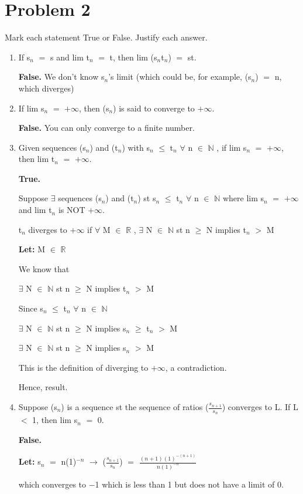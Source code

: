 \documentclass{article}
\newcommand{\mt}[1]{\ensuremath{#1}}
\newcommand\bsc[2][\DefaultOpt]{%
  \def\DefaultOpt{#2}%
  \section[#1]{#2}%
}
\newcommand{\balist}{\begin{enumerate}[label=\alph*.]}
\newcommand{\elist}{\end{enumerate}}
\newcommand{\lt}[1]{\textbf{Let: } #1}
\newcommand{\br}{\mt{\mathbb{R}} }       %
\newcommand{\bn}{\mt{\mathbb{N}} }       %
\newcommand{\fa}{\mt{\forall} }          %
\newcommand{\mem}{\mt{\in} }
\newcommand{\exs}{\mt{\exists} }
\newcommand{\lra}{ \mt{\longrightarrow} } %
\newcommand{\prn}[1]{(#1)}
\newcommand{\ps}{\mt{+} }
\newcommand{\ls}{\mt{<} }
\newcommand{\gr}{\mt{>} }
\newcommand{\lse}{\mt{\leq} }
\newcommand{\gre}{\mt{\geq} }
\newcommand{\eql}{\mt{=} }
\newcommand{\uw}[2]{#1\mt{_{#2}}}
\newcommand{\frc}[2]{\mt{\frac{#1}{#2}}}
\begin{document}
\bsc{Problem 2}{
Mark each statement True or False. Justify each answer.

\balist
\item If \uw{s}{n} \eql s and lim \uw{t}{n} \eql t, then lim (\uw{s}{n}\uw{t}{n}) \eql st.
	
	\textbf{False.} We don't know \uw{s}{n}'s limit (which could be, for example, (\uw{s}{n}) \eql n, which diverges)
\item If lim \uw{s}{n} \eql $+\infty$, then \prn{\uw{s}{n}} is said to converge to $+\infty$.
	
	\textbf{False.} You can only converge to a finite number.
\item Given sequences \prn{\uw{s}{n}} and \prn{\uw{t}{n}} with \uw{s}{n} \lse \uw{t}{n} \fa n \mem \bn, if lim \uw{s}{n} \eql $+\infty$, then lim \uw{t}{n} \eql $+\infty$.
	
	\textbf{True.} 
	
	Suppose \exs sequences \prn{\uw{s}{n}} and \prn{\uw{t}{n}} st \uw{s}{n} \lse \uw{t}{n} \fa n \mem \bn where lim \uw{s}{n} \eql $+\infty$ and  lim \uw{t}{n} is NOT $+\infty$.
	
	\uw{t}{n} diverges to $+\infty$ if \fa M \mem \br, \exs N \mem \bn st n \gre N implies \uw{t}{n} \gr M
	
	\lt{M \mem \br}
	
	We know that
	
	\exs N \mem \bn st n \gre N implies \uw{t}{n} \gr M
	
	Since \uw{s}{n} \lse \uw{t}{n} \fa n \mem \bn
	
	\exs N \mem \bn st n \gre N implies \uw{s}{n} \gre \uw{t}{n} \gr M
	
	\exs N \mem \bn st n \gre N implies \uw{s}{n} \gr M
	
	This is the definition of diverging to $+\infty$, a contradiction.
	
	Hence, result.
\item Suppose \prn{\uw{s}{n}} is a sequence st the sequence of ratios (\frc{\uw{s}{n \ps 1}}{\uw{s}{n}}) converges to L. If L \ls 1, then lim \uw{s}{n} \eql 0.
	
	\textbf{False.}
	
	\lt{\uw{s}{n} \eql n(1)$^{-n}$ \lra (\frc{\uw{s}{n \ps 1}}{\uw{s}{n}}) \eql $\frac{(n + 1)(1)^{-(n + 1)}}{n(1)^{-n}}$}
	
	which converges to $-$1 which is less than 1 but does not have a limit of 0. 
\elist
}
\end{document}
